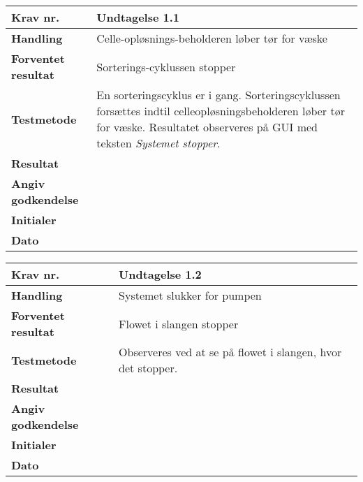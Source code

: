 \begin{center}
		\begin{longtable}{ | m{4cm}| m{8.5cm}|} 
			\hline
			\textbf{Krav nr.} & Undtagelse 1.1  \\ 
			\hline
			\textbf{Handling} & Celle-opløsnings-beholderen løber tør for væske   \\
			\hline
			\textbf{Forventet resultat} & Sorterings-cyklussen stopper \\
			\hline
			\textbf{Testmetode}  & En sorteringscyklus er i gang. Sorteringscyklussen forsættes indtil celleopløsningsbeholderen løber tør for væske. Resultatet observeres på GUI med teksten \textit{Systemet stopper}.  \\
			\hline
			\textbf{Resultat}  &    \\
			\hline
			\textbf{Angiv godkendelse} &     \\
			\hline
			\textbf{Initialer} &     \\
			\hline
			\textbf{Dato} &    \\
			\hline
		\end{longtable}
	\end{center}
	
\newpage	
			
	\begin{center}
		\begin{longtable}{ | m{4cm}| m{8.5cm}|} 
			\hline
			\textbf{Krav nr.} & Undtagelse 1.2  \\ 
			\hline
			\textbf{Handling} & Systemet slukker for pumpen   \\
			\hline
			\textbf{Forventet resultat} & Flowet i slangen stopper \\
			\hline
			\textbf{Testmetode}  & Observeres ved at se på flowet i slangen, hvor det stopper. \\
			\hline
			\textbf{Resultat}  &    \\
			\hline
			\textbf{Angiv godkendelse} &     \\
			\hline
			\textbf{Initialer} &     \\
			\hline
			\textbf{Dato} &    \\
			\hline
		\end{longtable}
	\end{center}
			
